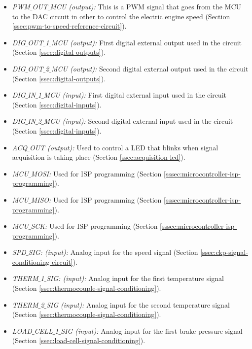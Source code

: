 \begin{itemize}
					\item \textit{PWM$\_$OUT$\_$MCU (output):} This is a PWM signal that goes from the MCU to the DAC circuit in other to control the electric engine speed (Section \ref{ssec:pwm-to-speed-reference-circuit}).\label{itm:mcu-port-pwm-out-mcu}
					\item \textit{DIG$\_$OUT$\_$1$\_$MCU (output):} First digital external output used in the circuit (Section \ref{ssec:digital-outputs}).\label{itm:mcu-port-dig-out-1-mcu}
					\item \textit{DIG$\_$OUT$\_$2$\_$MCU (output):} Second digital external output used in the circuit (Section \ref{ssec:digital-outputs}).\label{itm:mcu-port-dig-out-2-mcu}
					\item \textit{DIG$\_$IN$\_$1$\_$MCU (input):} First digital external input used in the circuit (Section \ref{ssec:digital-inputs}).\label{itm:mcu-port-dig-in-1-mcu}
					\item \textit{DIG$\_$IN$\_$2$\_$MCU (input):} Second digital external input used in the circuit (Section \ref{ssec:digital-inputs}).\label{itm:mcu-port-dig-in-2-mcu} 
					\item \textit{ACQ$\_$OUT (output):} Used to control a LED that blinks when signal acquisition is taking place (Section \ref{ssec:acquisition-led}).\label{itm:mcu-port-acq-out}   
					\item \textit{MCU$\_$MOSI:} Used for ISP programming (Section \ref{sssec:microcontroller-isp-programming}).\label{itm:mcu-port-mcu-mosi}
					\item \textit{MCU$\_$MISO:} Used for ISP programming (Section \ref{sssec:microcontroller-isp-programming}).\label{itm:mcu-port-mcu-miso}
					\item \textit{MCU$\_$SCK:} Used for ISP programming (Section \ref{sssec:microcontroller-isp-programming}).\label{itm:mcu-port-mcu-sck}
					\item \textit{SPD$\_$SIG: (input):} Analog input for the speed signal (Section \ref{ssec:ckp-signal-conditioning-circuit}).\label{itm:mcu-port-spd-sig}
					\item \textit{THERM$\_$1$\_$SIG: (input):} Analog input for the first temperature signal (Section \ref{ssec:thermocouple-signal-conditioning}).\label{itm:mcu-port-therm-1-sig}
					\item \textit{THERM$\_$2$\_$SIG (input):} Analog input for the second temperature signal (Section \ref{ssec:thermocouple-signal-conditioning}).\label{itm:mcu-port-therm-2-sig}
					\item \textit{LOAD$\_$CELL$\_$1$\_$SIG (input):} Analog input for the first brake pressure signal (Section \ref{ssec:load-cell-signal-conditioning}).\label{itm:mcu-port-load-cell-1-sig}  

\end{itemize}
